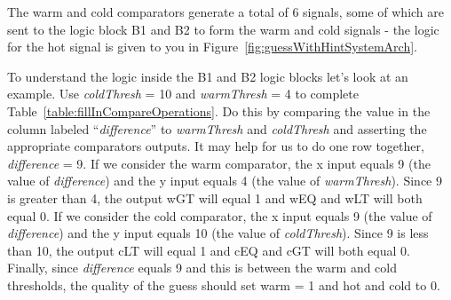 The warm and cold comparators generate a total of 6 signals, some of which are
sent to the logic block B1 and B2 to form the warm and cold signals - the logic for the
hot signal is given to you in Figure~\ref{fig:guessWithHintSystemArch}.

To understand the logic inside the B1 and B2 logic blocks let's look at an
example.  Use \emph{coldThresh} = 10 and \emph{warmThresh} = 4 to complete
Table~\ref{table:fillInCompareOperations}.  Do this by comparing the value in the column labeled
``\emph{difference}'' to \emph{warmThresh} and \emph{coldThresh} and
asserting the appropriate comparators outputs.  It may help for us to do one 
row together, \emph{difference} = 9. If we consider the
warm comparator, the x input equals 9 (the value of \emph{difference})
and the y input equals 4 (the value of \emph{warmThresh}). Since 9 is
greater than 4, the output wGT will equal 1 and wEQ and wLT will both
equal 0. If we consider the cold comparator, the x input equals 9 (the
value of \emph{difference}) and the y input equals 10 (the value of
\emph{coldThresh}). Since 9 is less than 10, the output cLT will equal 1
and cEQ and cGT will both equal 0. Finally, since \emph{difference}
equals 9 and this is between the warm and cold thresholds, the quality
of the guess should set warm = 1 and hot and cold to 0.

